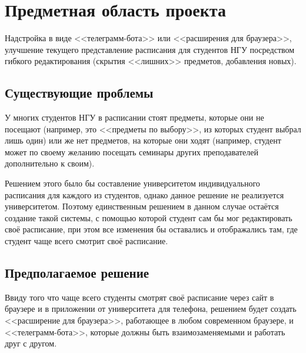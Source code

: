 \chapter{Предметная область проекта}
	\label{chapter2}

	Надстройка в виде <<телеграмм-бота>> или <<расширения для браузера>>, улучшение текущего представление расписания для студентов НГУ посредством гибкого редактирования (скрытия <<лишних>> предметов, добавления новых).

	\section{Существующие проблемы}
		У многих студентов НГУ в расписании стоят предметы, которые они не посещают (например, это <<предметы по выбору>>, из которых студент выбрал лишь один) или же нет предметов, на которые они ходят (например, студент может по своему желанию посещать семинары других преподавателей дополнительно к своим).

		Решением этого было бы составление университетом индивидуального расписания для каждого из студентов, однако данное решение не реализуется университетом. Поэтому единственным решением в данном случае остаётся создание такой системы, с помощью которой студент сам бы мог редактировать своё расписание, при этом все изменения бы оставались и отображались там, где студент чаще всего смотрит своё расписание. 
	\section{Предполагаемое решение}
		Ввиду того что чаще всего студенты смотрят своё расписание через сайт в браузере и в приложении от университета для телефона, решением будет создать <<расширение для браузера>>, работающее в любом современном браузере, и <<телеграмм-бота>>, которые должны быть взаимозаменяемыми и работать друг с другом.
